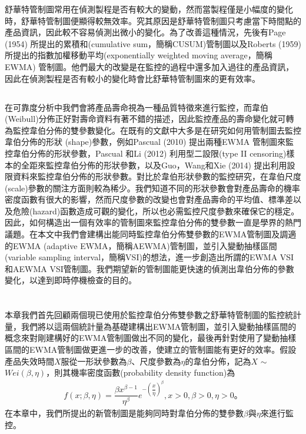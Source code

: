 \documentclass[12pt]{article}  %
\theoremstyle{plain}
\begin{document}
舒華特管制圖常用在偵測製程是否有較大的變動，然而當製程僅是小幅度的變化時，舒華特管制圖便顯得較無效率。究其原因是舒華特管制圖只考慮當下時間點的產品資訊，因此較不容易偵測出微小的變化。為了改善這種情況，先後有Page (1954) 所提出的累積和(cumulative sum，簡稱CUSUM)管制圖以及Roberts (1959) 所提出的指數加權移動平均(exponentially weighted moving average，簡稱EWMA) 管制圖。他們最大的改變是在監控的過程中還多加入過往的產品資訊，因此在偵測製程是否有較小的變化時會比舒華特管制圖來的更有效率。

\subsection{}
在可靠度分析中我們會將產品壽命視為一種品質特徵來進行監控，而韋伯(Weibull)分佈正好對壽命資料有著不錯的描述，因此監控產品的壽命變化就可轉為監控韋伯分佈的雙參數變化。在既有的文獻中大多是在研究如何用管制圖去監控韋伯分佈的形狀 (shape)參數，例如Pascual (2010) 提出兩種EWMA 管制圖來監控韋伯分佈的形狀參數，Pascual 和Li (2012) 利用型二設限(type II censoring)樣本的全距來監控韋伯分佈的形狀參數，以及Guo，Wang和Xie (2014) 提出利用設限資料來監控韋伯分佈的形狀參數。對比於韋伯形狀參數的監控研究，在韋伯尺度 (scale)參數的關注方面則較為稀少。我們知道不同的形狀參數會對產品壽命的機率密度函數有很大的影響，然而尺度參數的改變也會對產品壽命的平均值、標準差以及危險(hazard)函數造成可觀的變化，所以也必需監控尺度參數來確保它的穩定。因此，如何構造出一個有效率的管制圖來監控韋伯分佈的雙參數一直是學界的熱門議題。在本文中我們會建構出能同時監控韋伯分佈雙參數的EWMA管制圖及調適的EWMA (adaptive EWMA，簡稱AEWMA)管制圖，並引入變動抽樣區間(variable sampling interval，簡稱VSI)的想法，進一步創造出所謂的EWMA VSI和AEWMA VSI管制圖。我們期望新的管制圖能更快速的偵測出韋伯分佈的參數變化，以達到即時停機檢查的目的。

\newpage
\section{}
本章我們首先回顧兩個現已使用於監控韋伯分佈雙參數之舒華特管制圖的監控統計量，我們將以這兩個統計量為基礎建構出EWMA管制圖，並引入變動抽樣區間的概念來對剛建構好的EWMA管制圖做出不同的變化，最後再針對使用了變動抽樣區間的EWMA管制圖做更進一步的改善，使建立的管制圖能有更好的效率。假設產品失效時間$X$服從一形狀參數為$\beta$、尺度參數為$\eta$的韋伯分佈，記為$X$ $\sim$ $Wei(\beta,\eta)$，則其機率密度函數(probability density function)為
\begin{align*}
f{\left(x;\beta ,\eta \right) }=\dfrac {\beta x^{\beta -1}}{\eta ^{\beta }}e^{-\left( \dfrac {x}{\eta }\right) ^{\beta }},x>0,\beta>0,\eta>0 \mbox{。}
\end{align*}
在本章中，我們所提出的新管制圖是能夠同時對韋伯分佈的雙參數$\beta$與$\eta$來進行監控。
\end{document}

